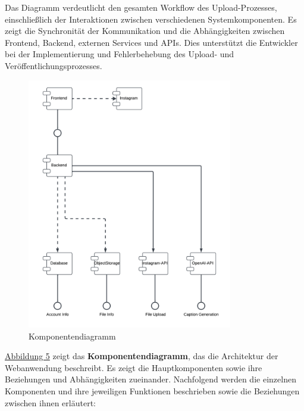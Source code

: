 Das Diagramm verdeutlicht den gesamten Workflow des Upload-Prozesses, einschließlich der Interaktionen zwischen verschiedenen Systemkomponenten. Es zeigt die Synchronität der Kommunikation 
und die Abhängigkeiten zwischen Frontend, Backend, externen Services und \acp{API}. Dies unterstützt die Entwickler bei der Implementierung und Fehlerbehebung des Upload- und Veröffentlichungsprozesses.


\begin{figure}[htb]
    \centering
    \includegraphics[width=0.8\textwidth]{graphics/components_diagram.png}
    \caption[Komponentendiagramm]{Komponentendiagramm\footnotemark}
    \label{fig:fig-5}
\end{figure}
\newpage

\hyperref[fig:fig-5]{Abbildung 5} zeigt das \textbf{Komponentendiagramm}, das die Architektur der Webanwendung beschreibt. Es zeigt die Hauptkomponenten sowie ihre Beziehungen und 
Abhängigkeiten zueinander. Nachfolgend werden die einzelnen Komponenten und ihre jeweiligen Funktionen beschrieben sowie die Beziehungen zwischen ihnen erläutert:

